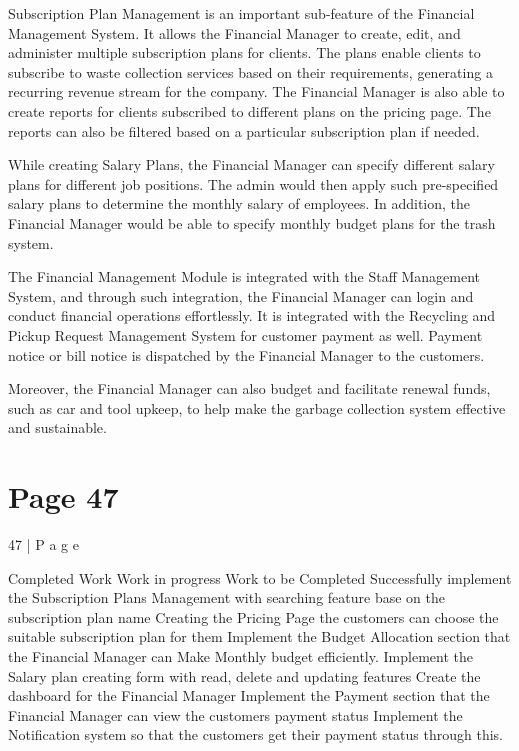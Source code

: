 \documentclass{article}
\begin{document}
Subscription Plan Management is an important sub-feature of the Financial Management 
System. It allows the Financial Manager to create, edit, and administer multiple 
subscription plans for clients. The plans enable clients to subscribe to waste collection 
services based on their requirements, generating a recurring revenue stream for the 
company. The Financial Manager is also able to create reports for clients subscribed to 
different plans on the pricing page. The reports can also be filtered based on a particular 
subscription plan if needed. 
 
While creating Salary Plans, the Financial Manager can specify different salary plans for 
different job positions. The admin would then apply such pre-specified salary plans to 
determine the monthly salary of employees. In addition, the Financial Manager would be 
able to specify monthly budget plans for the trash system. 
 
The Financial Management Module is integrated with the Staff Management System, and 
through such integration, the Financial Manager can login and conduct financial operations 
effortlessly. It is integrated with the Recycling and Pickup Request Management System for 
customer payment as well. Payment notice or bill notice is dispatched by the Financial 
Manager to the customers. 
 
Moreover, the Financial Manager can also budget and facilitate renewal funds, such as car 
and tool upkeep, to help make the garbage collection system effective and sustainable.  
 

\section*{Page 47}
47 | P a g e 
 
 
Completed Work Work in progress Work to be Completed 
Successfully implement the 
Subscription Plans 
Management with 
searching feature base on 
the subscription plan name 
Creating the Pricing Page 
the customers can choose 
the suitable subscription 
plan for them 
Implement the Budget 
Allocation section that the 
Financial Manager can 
Make Monthly budget 
efficiently. 
Implement the Salary plan 
creating form with read, 
delete and updating 
features 
Create the dashboard for 
the Financial Manager 
Implement the Payment 
section that the Financial 
Manager can view the 
customers payment status  
Implement the Notification 
system so that the 
customers get their 
payment status through 
this. 
 
\end{document}
